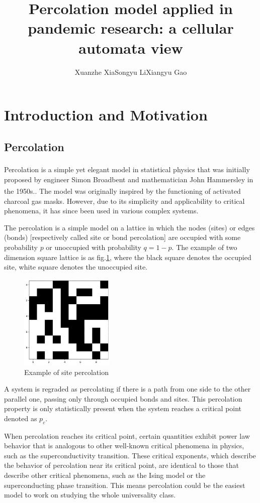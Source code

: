 \documentclass{article}
\title{Percolation model applied in pandemic research: a cellular automata view}
\author{Xuanzhe Xia\quad Songyu Li\quad Xiangyu Gao}
\newcommand{\upcite}[1]{\textsuperscript{\cite{#1}}}
\begin{document}
\maketitle
\section{Introduction and Motivation}
\subsection{Percolation}
Percolation\upcite{stauffer2018introduction} is a simple yet elegant model in statistical physics that was initially proposed by engineer Simon Broadbent and mathematician John Hammersley in the 1950s.\upcite{broadbent_percolation_1957}. The model was originally inspired by the functioning of activated charcoal gas masks. However, due to its simplicity and applicability to critical phenomena, it has since been used in various complex systems.

The percolation is a simple model on a lattice in which the nodes (sites) or edges (bonds) [respectively called site or bond percolation] are occupied with some probability $p$ or unoccupied with probability $q=1-p$. The example of two dimension square lattice is as fig.\ref{eg1}, where the black square denotes the occupied site, white square denotes the unoccupied site.
\begin{figure}[htbp]
    \label{eg1}
    \centering
    \includegraphics[width=0.4\textwidth]{pic/eg.png}
    \caption{Example of site percolation}
\end{figure}

A system is regraded as percolating if there is a path from one side to the other parallel one, passing only through occupied bonds and sites. This percolation property is only statistically present when the system reaches a critical point denoted as $p_c$.

When percolation reaches its critical point, certain quantities exhibit power law behavior that is analogous to other well-known critical phenomena in physics, such as the superconductivity transition. These critical exponents, which describe the behavior of percolation near its critical point, are identical to those that describe other critical phenomena, such as the Ising model or the superconducting phase transition. This means percolation could be the easiest model to work on studying the whole universality class.
\end{document}
